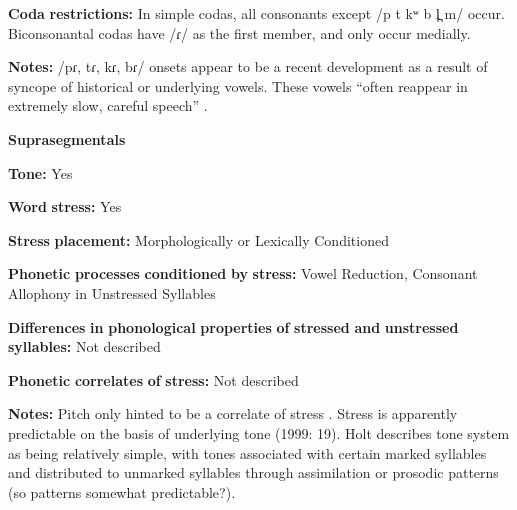 \begin{styleBody}
\textbf{Coda} \textbf{restrictions:} In simple codas, all consonants except /p t kʷ b l̪ m/ occur. Biconsonantal codas have /ɾ/ as the first member, and only occur medially.
\end{styleBody}

\begin{styleBody}
\textbf{Notes:} /pɾ, tɾ, kɾ, bɾ/ onsets appear to be a recent development as a result of syncope of historical or underlying vowels. These vowels “often reappear in extremely slow, careful speech” \citep[20]{Holt1999}.
\end{styleBody}

\begin{styleBody}
\textbf{Suprasegmentals}
\end{styleBody}

\begin{styleBody}
\textbf{Tone:} Yes
\end{styleBody}

\begin{styleBody}
\textbf{Word} \textbf{stress:} Yes
\end{styleBody}

\begin{styleBody}
\textbf{Stress} \textbf{placement:} Morphologically or Lexically Conditioned
\end{styleBody}

\begin{styleBody}
\textbf{Phonetic} \textbf{processes} \textbf{conditioned} \textbf{by} \textbf{stress:} Vowel Reduction, Consonant Allophony in Unstressed Syllables
\end{styleBody}

\begin{styleBody}
\textbf{Differences} \textbf{in} \textbf{phonological} \textbf{properties} \textbf{of} \textbf{stressed} \textbf{and} \textbf{unstressed} \textbf{syllables:} Not described
\end{styleBody}

\begin{styleBody}
\textbf{Phonetic} \textbf{correlates} \textbf{of} \textbf{stress:} Not described
\end{styleBody}

\begin{styleBody}
\textbf{Notes:} Pitch only hinted to be a correlate of stress \citep[238]{Holt1986}. Stress is apparently predictable on the basis of underlying tone (1999: 19). Holt describes tone system as being relatively simple, with tones associated with certain marked syllables and distributed to unmarked syllables through assimilation or prosodic patterns (so patterns somewhat predictable?).
\end{styleBody}

